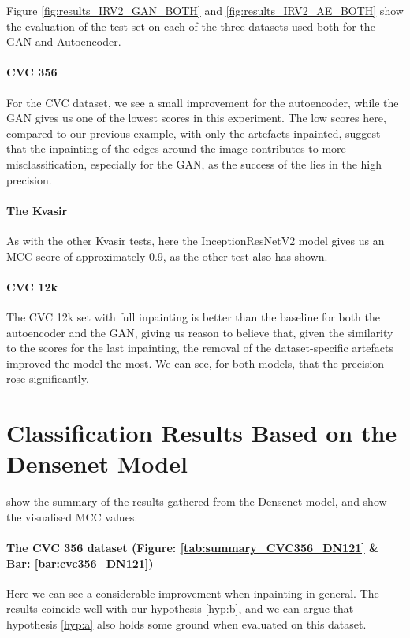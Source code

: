 \noindent Figure \ref{fig:results_IRV2_GAN_BOTH} and \ref{fig:results_IRV2_AE_BOTH} show the evaluation of the test set on each of the three datasets used both for the GAN and Autoencoder.


\paragraph{CVC 356}
For the CVC dataset, we see a small improvement for the autoencoder, while the GAN gives us one of the lowest scores in this experiment.
The low scores here, compared to our previous example, with only the artefacts inpainted, suggest that the inpainting of the edges around the image contributes to more misclassification, especially for the GAN, as the success of the lies in the high precision. 

\paragraph{The Kvasir}
As with the other Kvasir tests, here the InceptionResNetV2 model gives us an MCC score of approximately 0.9, as the other test also has shown.

\paragraph{CVC 12k}
The CVC 12k set with full inpainting is better than the baseline for both the autoencoder and the GAN, giving us reason to believe that, given the similarity to the scores for the last inpainting, the removal of the dataset-specific artefacts improved the model the most.
We can see, for both models, that the precision rose significantly.








\FloatBarrier
\section{Classification Results Based on the Densenet Model}
 show the summary of the results gathered from the Densenet model, and  show the visualised MCC values. 

\paragraph{The CVC 356 dataset (Figure: \ref{tab:summary_CVC356_DN121} \& Bar: \ref{bar:cvc356_DN121})}
Here we can see a considerable improvement when inpainting in general. The results coincide well with our hypothesis \ref{hyp:b}, and we can argue that hypothesis \ref{hyp:a} also holds some ground when evaluated on this dataset. 

